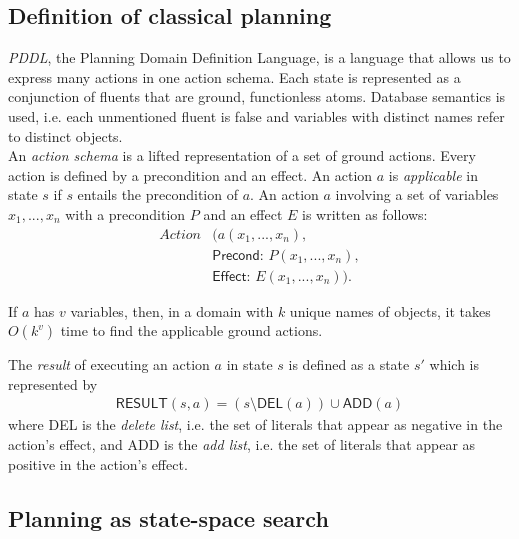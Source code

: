 \documentclass{article}
\begin{document}
\subsection{Definition of classical planning}

\begin{definition}[R\&N, p. 367]
    \emph{PDDL}, the Planning Domain Definition Language, is a language
    that allows us to express many actions in one action schema.
    Each state is represented as a conjunction of fluents that are ground,
    functionless atoms. Database semantics is used, i.e. each unmentioned
    fluent is false and variables with distinct names refer to distinct
    objects.\\
    An \emph{action schema} is a lifted representation of a set of ground
    actions. Every action is defined by a precondition and an effect. An
    action $a$ is \emph{applicable} in state $s$ if $s$ entails the precondition
    of $a$. An action $a$ involving a set of variables $x_1,...,x_n$ with
    a precondition $P$ and an effect $E$ is written as follows:
    \begin{align*}
        Action & (a(x_1, ..., x_n),                   \\
               & \textsf{Precond: } P(x_1, ..., x_n), \\
               & \textsf{Effect: } E(x_1, ..., x_n)).
    \end{align*}
\end{definition}

\begin{lemma}
    If $a$ has $v$ variables, then, in a domain with $k$ unique names of objects,
    it takes $O(k^v)$ time to find the applicable ground actions.
\end{lemma}

\begin{definition}
    The \emph{result} of executing an action $a$ in state $s$ is defined
    as a state $s'$ which is represented by
    \begin{align*}
        \textsf{RESULT}(s,a)=(s\setminus\textsf{DEL}(a))\cup\textsf{ADD}(a)
    \end{align*}
    where DEL is the \emph{delete list}, i.e. the set of literals that appear
    as negative in the action's effect, and ADD is the \emph{add list}, i.e.
    the set of literals that appear as positive in the action's effect.
\end{definition}

\subsection{Planning as state-space search}
\end{document}
